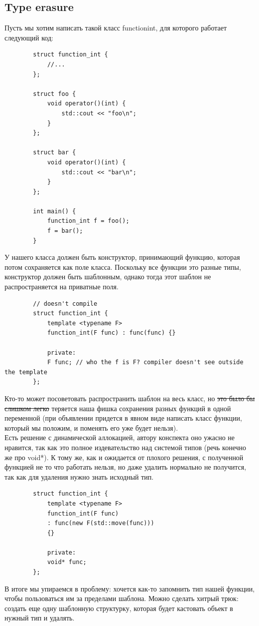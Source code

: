 \documentclass[12pt, a4paper]{article}
\begin{document}
	\subsection{Type erasure}
	Пусть мы хотим написать такой класс function\textunderscore int, для которого работает следующий код:
	\begin{verbatim}
		struct function_int {
			//...
		};
		
		struct foo {
			void operator()(int) {
				std::cout << "foo\n";
			}
		};
		
		struct bar {
			void operator()(int) {
				std::cout << "bar\n";
			}
		};
		
		int main() {
			function_int f = foo();
			f = bar();
		}
	\end{verbatim}
	У нашего класса должен быть конструктор, принимающий функцию, которая потом сохраняется как поле класса. Поскольку все функции это разные типы, конструктор должен быть шаблонным, однако тогда этот шаблон не распространяется на приватные поля.
	\begin{verbatim}
		// doesn't compile
		struct function_int {
			template <typename F>
			function_int(F func) : func(func) {}
			
			private:
			F func; // who the f is F? compiler doesn't see outside the template
		};
	\end{verbatim}
	Кто-то может посоветовать распространить шаблон на весь класс, но \sout{это было бы слишком легко} теряется наша фишка сохранения разных функций в одной переменной (при объявлении придется в явном виде написать класс функции, который мы положим, и поменять его уже будет нельзя).\\
	Есть решение с динамической аллокацией, автору конспекта оно ужасно не нравится, так как это полное издевательство над системой типов (речь конечно же про void*). К тому же, как и ожидается от плохого решения, с полученной функцией не то что работать нельзя, но даже удалить нормально не получится, так как для удаления нужно знать исходный тип.
	\begin{verbatim}
		struct function_int {
			template <typename F>
			function_int(F func) 
			: func(new F(std::move(func))) 
			{}
			
			private:
			void* func;
		};
	\end{verbatim}
	В итоге мы упираемся в проблему: хочется как-то запомнить тип нашей функции, чтобы пользоваться им за пределами шаблона. Можно сделать хитрый трюк: создать еще одну шаблонную структурку, которая будет кастовать объект в нужный тип и удалять.
\end{document}
